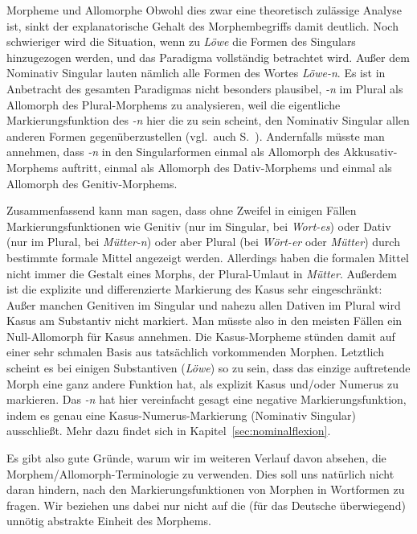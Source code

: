 \begin{Vertiefung}{Morpheme und Allomorphe}
Obwohl dies zwar eine theoretisch zulässige Analyse ist, sinkt der explanatorische Gehalt des Morphembegriffs damit deutlich.
Noch schwieriger wird die Situation, wenn zu \textit{Löwe} die Formen des Singulars hinzugezogen werden, und das Paradigma vollständig betrachtet wird.
Außer dem Nominativ Singular lauten nämlich alle Formen des Wortes \textit{Löwe-n}.
Es ist in Anbetracht des gesamten Paradigmas nicht besonders plausibel, \textit{-n} im Plural als Allomorph des Plural-Morphems zu analysieren, weil die eigentliche Markierungsfunktion des \textit{-n} hier die zu sein scheint, den Nominativ Singular allen anderen Formen gegenüberzustellen (vgl.\ auch S.~\pageref{abs:4578239547}).
Andernfalls müsste man annehmen, dass \textit{-n} in den Singularformen einmal als Allomorph des Akkusativ-Morphems auftritt, einmal als Allomorph des Dativ-Morphems und einmal als Allomorph des Genitiv-Morphems.


Zusammenfassend kann man sagen, dass ohne Zweifel in einigen Fällen Markierungsfunktionen wie Genitiv (nur im Singular, \zB bei \textit{Wort-es}) oder Dativ (nur im Plural, \zB bei \textit{Mütter-n}) oder aber Plural (\zB bei \textit{Wört-er} oder \textit{Mütter}) durch bestimmte formale Mittel angezeigt werden.
Allerdings haben die formalen Mittel nicht immer die Gestalt eines Morphs, \zB der Plural-Umlaut in \textit{Mütter}.
Außerdem ist die explizite und differenzierte Markierung des Kasus sehr eingeschränkt:
Außer manchen Genitiven im Singular und nahezu allen Dativen im Plural wird Kasus am Substantiv nicht markiert.
Man müsste also in den meisten Fällen ein Null-Allomorph für Kasus annehmen.
Die Kasus-Morpheme stünden damit auf einer sehr schmalen Basis aus tatsächlich vorkommenden Morphen.
Letztlich scheint es bei einigen Substantiven (\zB \textit{Löwe}) so zu sein, dass das einzige auftretende Morph eine ganz andere Funktion hat, als explizit Kasus und\slash oder Numerus zu markieren.
Das \textit{-n} hat hier vereinfacht gesagt eine negative Markierungsfunktion, indem es genau eine Kasus-Numerus-Markierung (Nominativ Singular) ausschließt.
Mehr dazu findet sich in Kapitel~\ref{sec:nominalflexion}.

Es gibt also gute Gründe, warum wir im weiteren Verlauf davon absehen, die Morphem\slash Allomorph-Terminologie zu verwenden.
Dies soll uns natürlich nicht daran hindern, nach den Markierungsfunktionen von Morphen in Wortformen zu fragen.
Wir beziehen uns dabei nur nicht auf die (für das Deutsche überwiegend) unnötig abstrakte Einheit des Morphems.

\end{Vertiefung}

